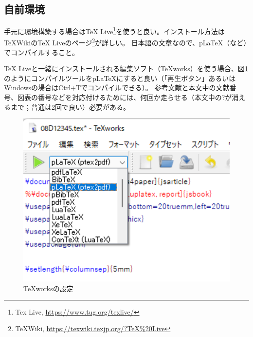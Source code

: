\documentclass[twocolumn, a4paper]{jsarticle}
\begin{document}
\subsection*{自前環境}
手元に環境構築する場合はTeX Live\footnote{Tex Live, \url{https://www.tug.org/texlive/}}を使うと良い。インストール方法は\TeX WikiのTeX Liveのページ\footnote{\TeX Wiki, \url{https://texwiki.texjp.org/?TeX%20Live}}が詳しい。 
日本語の文章なので、pLaTeX（など）でコンパイルすること。

TeX Liveと一緒にインストールされる編集ソフト（TeXworks）を使う場合、図\ref{fig:texworks}のようにコンパイルツールをpLaTeXにすると良い（「再生ボタン」あるいはWindowsの場合はCtrl+Tでコンパイルできる）。
参考文献と本文中の文献番号、図表の番号などを対応付けるためには、何回か走らせる（本文中の?が消えるまで；普通は2回で良い）必要がある。

\begin{figure}[t]
\centering
\includegraphics[width=\linewidth]{texworks.png}
\caption{TeXworksの設定}
\label{fig:texworks}
\end{figure}
\end{document}
